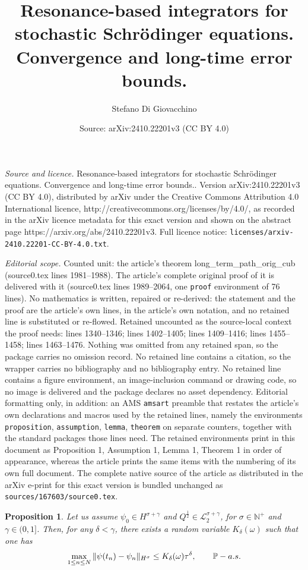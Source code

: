 \documentclass[10pt,a4paper]{amsart}
\title{Resonance-based integrators for stochastic Schrödinger equations. Convergence and long-time error bounds.}
\author{Stefano Di Giovacchino}
\date{Source: arXiv:2410.22201v3 (CC BY 4.0)}
\newtheorem{proposition}{Proposition}
\begin{document}
\maketitle

\noindent\emph{Source and licence.} Resonance-based integrators for stochastic Schrödinger equations. Convergence and long-time error bounds.. Version arXiv:2410.22201v3 (CC BY 4.0), distributed by arXiv under the Creative Commons Attribution 4.0 International licence, http://creativecommons.org/licenses/by/4.0/, as recorded in the arXiv licence metadata for this exact version and shown on the abstract page https://arxiv.org/abs/2410.22201v3. Full licence notice: \texttt{licenses/arxiv-2410.22201-CC-BY-4.0.txt}.\par\smallskip

\noindent\textit{Editorial scope.} Counted unit: the article's theorem long\_term\_path\_orig\_cub (source0.tex lines 1981--1988). The article's complete original proof of it is delivered with it (source0.tex lines 1989--2064, one \texttt{proof} environment of 76 lines). No mathematics is written, repaired or re-derived: the statement and the proof are the article's own lines, in the article's own notation, and no retained line is substituted or re-flowed.  Retained uncounted as the source-local context the proof needs: lines 1340--1346; lines 1402--1405; lines 1409--1416; lines 1455--1458; lines 1463--1476.  Nothing was omitted from any retained span, so the package carries no omission record.  No retained line contains a citation, so the wrapper carries no bibliography and no bibliography entry.  No retained line contains a figure environment, an image-inclusion command or drawing code, so no image is delivered and the package declares no asset dependency.  Editorial formatting only, in addition: an AMS \texttt{amsart} preamble that restates the article's own declarations and macros used by the retained lines, namely the environments \texttt{proposition}, \texttt{assumption}, \texttt{lemma}, \texttt{theorem} on separate counters, together with the standard packages those lines need.  The retained environments print in this document as Proposition 1, Assumption 1, Lemma 1, Theorem 1 in order of appearance, whereas the article prints the same items with the numbering of its own full document.  The complete native source of the article as distributed in the arXiv e-print for this exact version is bundled unchanged as \texttt{sources/167603/source0.tex}.
    \begin{proposition}
    \label{conv_path1}
        Let us assume $\psi_0\in H^{\sigma+\gamma}$ and $Q^{\frac{1}{2}}\in\mathcal{L}_2^{\sigma+\gamma}$, for $\sigma\in \mathbb{N}^+$ and $\gamma\in(0,1]$. Then, for any $\delta<\gamma$, there exists a random variable $K_\delta(\omega)$ such that one has
        $$
        \max_{1\le n\le N}\|\psi(t_n)-\psi_n\|_{H^\sigma}\le K_\delta(\omega) \tau^\delta,\qquad \mathbb{P}-{\rm a.s.}
        $$
    \end{proposition}
\end{document}
